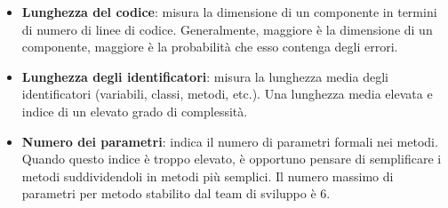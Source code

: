 \begin{itemize}
	\begin{itemize}
		\item \textbf{Lunghezza del codice}: misura la dimensione di un componente in termini di numero di linee di codice. Generalmente, maggiore è la dimensione di un componente, maggiore è la probabilità che esso contenga degli errori.
		\item \textbf{Lunghezza degli identificatori}: misura la lunghezza media degli identificatori (variabili, classi, metodi, etc.). Una lunghezza media elevata e indice di un elevato grado di complessità.
		\item \textbf{Numero dei parametri}: indica il numero di parametri formali nei metodi. Quando questo indice è troppo elevato, è opportuno pensare di semplificare i metodi suddividendoli in metodi più semplici. Il numero massimo di parametri per metodo stabilito dal team di sviluppo è 6.
	\end{itemize}
\end{itemize}